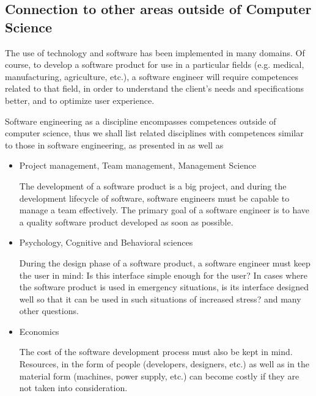 \documentclass[a4paper]{article}
\begin{document}
        \subsection*{Connection to other areas outside of Computer Science}

            The use of technology and software has been implemented in many domains. Of course, to develop a software product for use in a particular fields (e.g. medical, manufacturing, agriculture, etc.), a software engineer will require competences related to that field, in order to understand the client's needs and specifications better, and to optimize user experience.

            Software engineering as a discipline encompasses competences outside of computer science, thus we shall list related disciplines with competences similar to those in software engineering, as presented in \cite{swebokv3} as well as \cite{denning2000computer}

            \begin{itemize}
                \item Project management, Team management, Management Science
                    
                    The development of a software product is a big project, and during the development lifecycle of software, software engineers must be capable to manage a team effectively. The primary goal of a software engineer is to have a quality software product developed as soon as possible.

                \item Psychology, Cognitive and Behavioral sciences
                
                    During the design phase of a software product, a software engineer must keep the user in mind: Is this interface simple enough for the user? In cases where the software product is used in emergency situations, is its interface designed well so that it can be used in such situations of increased stress? and many other questions.

                \item Economics
                
                    The cost of the software development process must also be kept in mind. Resources, in the form of people (developers, designers, etc.) as well as in the material form (machines, power supply, etc.) can become costly if they are not taken into consideration.

            \end{itemize}
\end{document}
